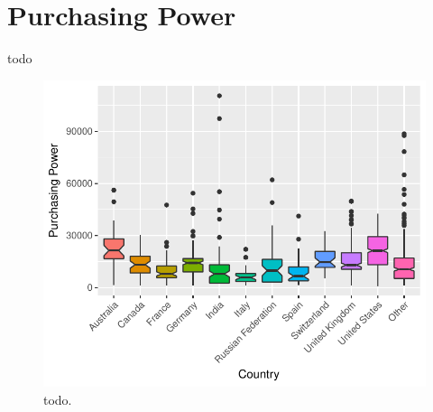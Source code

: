 \documentclass[9pt]{article}
\begin{document}
% 
% 
% 
% 
% 
% 

\section{Purchasing Power}
todo


\begin{figure}[H]
\centering
\includegraphics{report-007}
\caption{todo.}\label{fig_4}
\end{figure}
\end{document}
